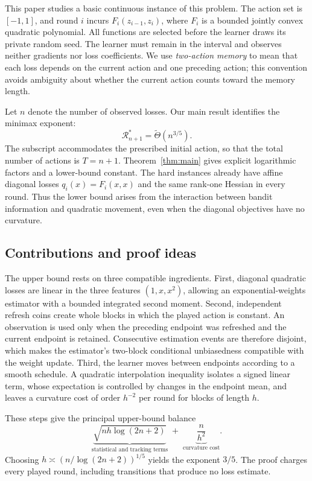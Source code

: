 \documentclass[11pt]{article}
\theoremstyle{definition}
\begin{document}
This paper studies a basic continuous instance of this problem. The action set is $[-1,1]$, and round $i$ incurs $F_i(z_{i-1},z_i)$, where $F_i$ is a bounded jointly convex quadratic polynomial. All functions are selected before the learner draws its private random seed. The learner must remain in the interval and observes neither gradients nor loss coefficients. We use \emph{two-action memory} to mean that each loss depends on the current action and one preceding action; this convention avoids ambiguity about whether the current action counts toward the memory length.

Let $n$ denote the number of observed losses. Our main result identifies the minimax exponent:
\begin{equation}\label{eq:intro-rate}
 \mathcal R_{n+1}^*
 =\widetilde\Theta(n^{3/5}).
\end{equation}
The subscript accommodates the prescribed initial action, so that the total number of actions is $T=n+1$. Theorem~\ref{thm:main} gives explicit logarithmic factors and a lower-bound constant. The hard instances already have affine diagonal losses $q_i(x)=F_i(x,x)$ and the same rank-one Hessian in every round. Thus the lower bound arises from the interaction between bandit information and quadratic movement, even when the diagonal objectives have no curvature.

\subsection{Contributions and proof ideas}

The upper bound rests on three compatible ingredients. First, diagonal quadratic losses are linear in the three features $(1,x,x^2)$, allowing an exponential-weights estimator with a bounded integrated second moment. Second, independent refresh coins create whole blocks in which the played action is constant. An observation is used only when the preceding endpoint was refreshed and the current endpoint is retained. Consecutive estimation events are therefore disjoint, which makes the estimator's two-block conditional unbiasedness compatible with the weight update. Third, the learner moves between endpoints according to a smooth schedule. A quadratic interpolation inequality isolates a signed linear term, whose expectation is controlled by changes in the endpoint mean, and leaves a curvature cost of order $h^{-2}$ per round for blocks of length $h$.

These steps give the principal upper-bound balance
\begin{equation}\label{eq:intro-upper-balance}
 \underbrace{\sqrt{nh\log(2n+2)}}_{\text{statistical and tracking terms}}
 \; + \;
 \underbrace{\frac{n}{h^2}}_{\text{curvature cost}}.
\end{equation}
Choosing $h\asymp(n/\log(2n+2))^{1/5}$ yields the exponent $3/5$. The proof charges every played round, including transitions that produce no loss estimate.
\end{document}
